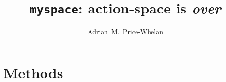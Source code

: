 \documentclass[modern]{aastex62}
\begin{document}
\sloppy\sloppypar\raggedbottom\frenchspacing %

\title{\textbf{\texttt{myspace}: action-space is \textsl{over}}}

\author{Adrian~M.~Price-Whelan}


\begin{abstract}\noindent %
\end{abstract}







\section{Methods}
\label{sec:methods}
\end{document}
